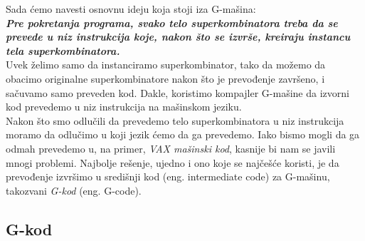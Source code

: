 Sada ćemo navesti osnovnu ideju koja stoji iza G-mašina: \\
\textbf{{\em Pre pokretanja programa, svako telo superkombinatora treba da se prevede u niz instrukcija koje, nakon što se izvrše, kreiraju instancu tela superkombinatora.}}\\

Uvek želimo samo da instanciramo superkombinator, tako da možemo da obacimo originalne superkombinatore nakon što je prevođenje završeno, i sačuvamo samo preveden kod. Dakle, koristimo kompajler G-mašine da izvorni kod prevedemo u niz instrukcija na mašinskom jeziku. \\

Nakon što smo odlučili da prevedemo telo superkombinatora u niz instrukcija moramo da odlučimo u koji jezik ćemo da ga prevedemo. Iako bismo mogli da ga odmah prevedemo u, na primer, {\em VAX mašinski kod}, kasnije bi nam se javili mnogi problemi.
Najbolje rešenje, ujedno i ono koje se najčešće koristi, je da prevođenje izvršimo u središnji kod (eng. intermediate code) za G-mašinu, takozvani {\em G-kod} (eng. G-code). \\

\subsection{G-kod}

